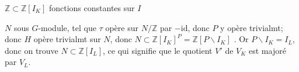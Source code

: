 
$\mathbb Z\subset\mathbb Z[I_K]$ fonctions constantes sur $I$


$N$ sous $G$-module, tel que $\tau$ opère sur $N/\mathbb Z$ par $-\mathrm{id}$,
donc $P$ y opère trivialmt; donc $H$ opère trivialmt sur $N$, donc
$N\subset\mathbb Z[I_K]^P=\mathbb Z[P\backslash I_K]$
.
Or $P\backslash I_K=I_L$, donc on trouve \deleted{$\subset$}
$N\subset\mathbb Z[I_L]$, ce qui signifie que le quotient $V'$ de $V_K$ est majoré par $V_L$.

